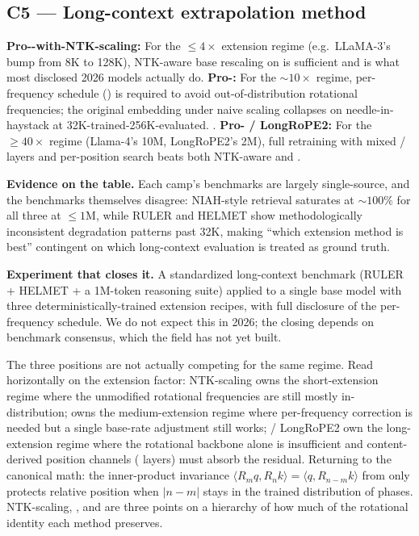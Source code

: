 \subsection{C5 --- Long-context extrapolation method}
\label{sec:c-longctx}

\textbf{Pro--with-NTK-scaling:} For the $\le 4\times$ extension
regime (e.g.\ LLaMA-3's bump from 8K to 128K), NTK-aware base rescaling
on  \citep{su2021} is sufficient and is what most disclosed
2026 models actually do. \textbf{Pro-:} For the $\sim 10\times$
regime, per-frequency schedule () is required to avoid
out-of-distribution rotational frequencies; the original
\citet{su2021} embedding under naive scaling collapses on
needle-in-haystack at 32K-trained-256K-evaluated.
. \textbf{Pro-
/ LongRoPE2:} For the $\ge 40\times$ regime (Llama-4's 10M, LongRoPE2's
2M), full retraining with mixed / layers and per-position
search beats both NTK-aware and 
\citep{longrope2-2025, meta-llama4}.

\textbf{Evidence on the table.} Each camp's benchmarks are largely
single-source, and the benchmarks themselves disagree: NIAH-style
retrieval saturates at $\sim 100\%$ for all three at $\le 1\mathrm{M}$,
while RULER and HELMET show methodologically inconsistent degradation
patterns past 32K, making ``which extension method is best'' contingent
on which long-context evaluation is treated as ground truth.

\textbf{Experiment that closes it.} A standardized long-context
benchmark (RULER + HELMET + a 1M-token reasoning suite) applied to a
single base model with three deterministically-trained extension
recipes, with full disclosure of the per-frequency schedule. We do not
expect this in 2026; the closing depends on benchmark consensus, which
the field has not yet built.

\begin{intuition}
The three positions are not actually competing for the same regime.
Read horizontally on the extension factor: NTK-scaling owns the
short-extension regime where the unmodified rotational frequencies are
still mostly in-distribution;  owns the medium-extension regime
where per-frequency correction is needed but a single base-rate
adjustment still works;  / LongRoPE2 own the long-extension regime
where the rotational backbone alone is insufficient and content-derived
position channels ( layers) must absorb the residual.
Returning to the canonical math: the inner-product invariance
$\langle R_m q, R_n k \rangle = \langle q, R_{n-m} k \rangle$ from
\citet[\S 3.4]{su2021} only protects relative position when $|n-m|$
stays in the trained distribution of phases. NTK-scaling, , and
 are three points on a hierarchy of how much of the rotational
identity each method preserves.
\end{intuition}

